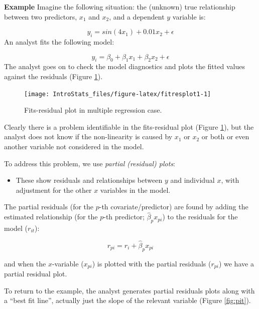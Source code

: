 \documentclass[
  oneside]{krantz}
\providecommand{\tightlist}{%
  \setlength{\itemsep}{0pt}\setlength{\parskip}{0pt}}
\begin{document}
\textbf{Example} Imagine the following situation: the (unknown) true relationship between two predictors, \(x_1\) and \(x_2\), and a dependent \(y\) variable is:

\[y_i= sin (4x_1)+0.01x_2+\epsilon\]
An analyst fits the following model:

\[y_i= \beta_0 +\beta_1x_1+\beta_2x_2+\epsilon\]
The analyst goes on to check the model diagnostics and plots the fitted values against the residuals (Figure \ref{fig:fitresplot1}).

\begin{figure}

{\centering \texttt{[image: IntroStats\_files/figure-latex/fitresplot1-1]} 

}

\caption{Fits-residual plot in multiple regression case.}\label{fig:fitresplot1}
\end{figure}

Clearly there is a problem identifiable in the fits-residual plot (Figure \ref{fig:fitresplot1}), but the analyst does not know if the non-linearity is caused by \(x_1\) or \(x_2\) or both or even another variable not considered in the model.

To address this problem, we use \emph{partial (residual) plots}:

\begin{itemize}
\tightlist
\item
  These show residuals and relationships between \(y\) and individual \(x\), with adjustment for the other \(x\) variables in the model.
\end{itemize}

The partial residuals (for the \(p\)-th covariate/predictor) are found by adding the estimated relationship (for the \(p\)-th predictor; \(\hat{\beta}_px_{pi}\)) to the residuals for the model (\(r_{it}\)):

\begin{equation}
r_{pi}=r_{i}+\hat{\beta}_px_{pi}
\end{equation}

and when the \(x\)-variable (\(x_{pi}\)) is plotted with the partial residuals (\(r_{pi}\)) we have a partial residual plot.

To return to the example, the analyst generates partial residuals plots along with a ``best fit line'', actually just the slope of the relevant variable (Figure \ref{fig:pit}).
\end{document}
